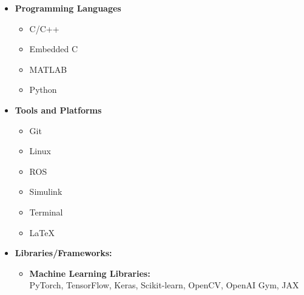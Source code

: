 \documentclass[12pt]{article}
\begin{document}
\begin{itemize} \itemsep -12pt
	\item \textbf{Programming Languages}
	\vspace{-8pt}
	\begin{multicols}{4}
		\begin{itemize}

			\item C/C++
			\item Embedded C
			\item MATLAB
			\item Python \faPython
		\end{itemize}
	\end{multicols}
	\item \textbf{Tools and Platforms}
	\vspace{-8pt}
	\begin{multicols}{3}
		\begin{itemize}
			\item Git \faGitSquare
			\item Linux \faLinux
			\item ROS
			\item Simulink
			\item Terminal \faTerminal
			\item \LaTeX
		\end{itemize}
	\end{multicols}
	\item \textbf{Libraries/Frameworks:}
	\vspace{-8pt}
	\begin{itemize}
		\item \textbf{Machine Learning Libraries:}\\
		PyTorch, TensorFlow, Keras, Scikit-learn, OpenCV, OpenAI Gym, JAX

\end{itemize}
\end{itemize}
\end{document}
